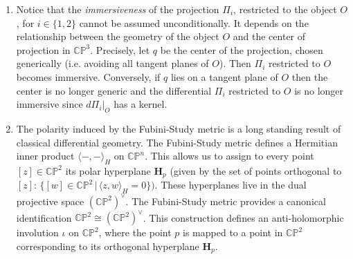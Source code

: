 \documentclass[runningheads]{llncs}
\begin{document}
\begin{enumerate}
\item[(1)] Notice that the {\it immersiveness} of the projection \( \Pi_i \), restricted to the object $O$, for $i\in \{1,2\}$ cannot be assumed unconditionally. It depends on the relationship between the geometry of the object $O$ and the center of projection in $ \mathbb{CP}^3$. Precisely, let $q$ be the center of the projection, chosen generically (i.e. avoiding all tangent planes of $O$). Then  \( \Pi_i \) restricted to $O$ becomes immersive. Conversely, if $q$ lies on a tangent plane of $O$ then the center is no longer generic and the differential  \( \Pi_i \) restricted to $O$ is no longer immersive since $d\Pi_i|_O$ has a kernel.
\item[(2)] The polarity induced by the Fubini-Study metric is a long standing result of classical differential geometry. The Fubini-Study metric defines a Hermitian inner product $\langle -,-\rangle_H$ on $\mathbb{CP}^n$. This allows us to assign to every point $[z]\in \mathbb{CP}^2$ its polar hyperplane {\bf H}$_p$ (given by the set of points orthogonal to $[z]:\, \{[w]\in\mathbb{CP}^2\, |\, \langle z,w\rangle_H=0\})$. These hyperplanes live in the dual projective space $(\mathbb{CP}^2)^\vee$. The Fubini-Study metric provides a canonical identification $ \mathbb{CP}^2\cong (\mathbb{CP}^2)^{\vee}$. This construction defines an anti-holomorphic involution  $\iota$ on $\mathbb{CP}^2$, where the point $p$ is mapped to a point in  $\mathbb{CP}^2$ corresponding to its orthogonal hyperplane {\bf H}$_p$. 
\end{enumerate}
\end{document}
